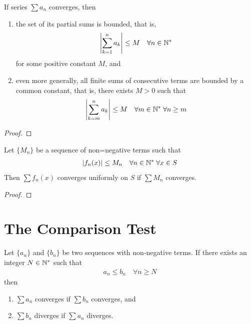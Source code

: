 \documentclass[thmcnt=section, 12pt]{my-elegantbook}
\begin{document}
\begin{theorem} \label{thm:51}
    If series $\sum a_n$ converges, then 
    \begin{enumerate}
        \item the set of its partial sums is bounded, that is, 
        \begin{align*}
            \left\lvert \sum_{k=1}^n a_k \right\rvert \leq M
            \quad \forall n \in \mathbb{N}^\ast
        \end{align*}
        for some positive constant $M$, and
        \item even more generally, all finite sums of consecutive terms are bounded by a common constant, that is, there exists $M > 0$ such that 
        \begin{align*}
            \left\lvert \sum_{k=m}^n a_k \right\rvert \leq M
            \quad \forall m \in \mathbb{N}^\ast \; 
            \forall n \geq m
        \end{align*}
    \end{enumerate}
\end{theorem}

\begin{proof}
\end{proof}


\begin{theorem} \label{thm:56}
    Let $\{M_n\}$ be a sequence of non=negative terms such that 
    \begin{align*}
        \left\lvert f_n(x) \right\rvert \leq M_n
        \quad \forall n \in \mathbb{N}^\ast \; 
        \forall x \in S
    \end{align*}
    Then $\sum f_n(x)$ converges uniformly on $S$ if $\sum M_n$ converges.
\end{theorem}

\begin{proof}
\end{proof}


\section{The Comparison Test}


\begin{theorem} \label{thm:52}
    Let $\{a_n\}$ and $\{b_n\}$ be two sequences with non-negative terms. If there exists an integer $N \in \mathbb{N}^\ast$ such that 
    \begin{align*}
        a_n \leq b_n
        \quad \forall n \geq N
    \end{align*}
    then 
    \begin{enumerate}
        \item $\sum a_n$ converges if $\sum b_n$ converges, and 
        \item $\sum b_n$ diverges if $\sum a_n$ diverges.
    \end{enumerate}
\end{theorem}
\end{document}
